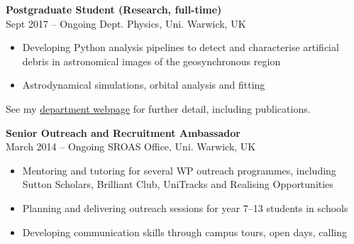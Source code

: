 \documentclass[10pt,a4paper]{altacv}
\begin{document}

\begin{fullwidth}
\makecvheader
\end{fullwidth}



\normalsize \textbf{Postgraduate Student (Research, full-time)} \\ \small \faCalendar \hspace{2pt} Sept 2017 -- Ongoing \hspace{17pt} \faMapMarker \hspace{2pt} Dept. Physics, Uni. Warwick, UK
\smallskip
\begin{itemize}
	\item Developing Python analysis pipelines to detect and characterise artificial debris in astronomical images of the geosynchronous region 
	\item Astrodynamical simulations, orbital analysis and fitting
\end{itemize}
\small See my \href{https://warwick.ac.uk/fac/sci/physics/research/astro/people/jamesblake/}{department webpage} for further detail, including publications.

\medskip

\normalsize \textbf{Senior Outreach and Recruitment Ambassador} \\ \small \faCalendar \hspace{2pt} March 2014 -- Ongoing \hspace{10pt} \faMapMarker \hspace{2pt} SROAS Office, Uni. Warwick, UK
\smallskip
\begin{itemize}
	\item Mentoring and tutoring for several WP outreach programmes, including Sutton Scholars, Brilliant Club, UniTracks and Realising Opportunities
	\item Planning and delivering outreach sessions for year 7--13 students in schools
	\item Developing communication skills through campus tours, open days, calling
\end{itemize}
\end{document}
